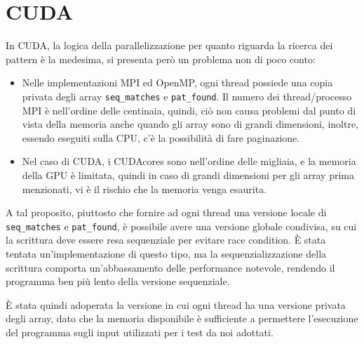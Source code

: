 \documentclass[12pt,openany]{report}
\begin{document}
\newpage 
\section{CUDA}
In CUDA, la logica della parallelizzazione per quanto riguarda la ricerca dei pattern è la medesima, si presenta però un problema non di poco conto:
\begin{itemize}
    \item Nelle implementazioni MPI ed OpenMP, ogni thread possiede una copia privata degli array \texttt{seq\_matches} e \texttt{pat\_found}. Il numero dei thread/processo MPI è nell'ordine delle centinaia, quindi, ciò non causa problemi dal punto di vista della memoria anche quando gli array sono di grandi dimensioni, inoltre, essendo eseguiti sulla CPU, c'è la possibilità di fare paginazione.
    \item Nel caso di CUDA, i CUDAcores sono nell'ordine delle migliaia, e la memoria della GPU è limitata, quindi in caso di grandi dimensioni per gli array prima menzionati, vi è il rischio che la memoria venga esaurita.
\end{itemize} 
A tal proposito, piuttosto che fornire ad ogni thread una versione locale di  \texttt{seq\_matches} e \texttt{pat\_found}, è possibile avere una versione globale condivisa, su cui la scrittura deve essere resa sequenziale per evitare race condition. È stata tentata un'implementazione di questo tipo, ma la sequenzializzazione della scrittura comporta un'abbassamento delle performance notevole, rendendo il programma ben più lento della versione sequenziale.\bigskip 

È stata quindi adoperata la versione in cui ogni thread ha una versione privata degli array, dato che la memoria disponibile è sufficiente a permettere l'esecuzione del programma sugli input utilizzati per i test da noi adottati.\bigskip 
\end{document}
